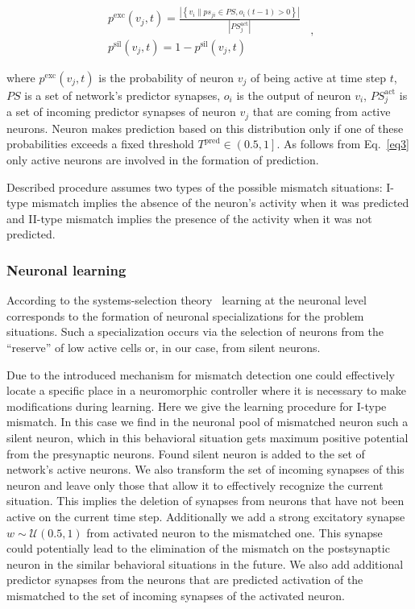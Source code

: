 \documentclass[letterpaper]{article}
\begin{document}
\begin{equation}
	\label{eq3}
	\begin{array}{c}
		p^{\mathrm{exc}}\left(v_{j}, t\right) = \frac{\left\vert\left\{v_{i} \| ps_{ji} \in PS, o_{i}\left(t-1\right)>0\right\}\right\vert}
			{\left\vert PS_{j}^{\mathrm{act}}\right\vert} \\
		p^{\mathrm{sil}}\left(v_{j}, t\right) = 1 - p^{\mathrm{sil}}\left(v_{j}, t\right)
	\end{array}
	\enspace , 
\end{equation}      

\noindent where $p^{\mathrm{exc}}\left(v_{j}, t\right)$ is the probability of neuron $v_{j}$ of being active at time step $t$, $PS$ is a set of network's predictor synapses, $o_{i}$ is the output of neuron $v_{i}$, $PS_{j}^{\mathrm{act}}$ is a set of incoming predictor synapses of neuron $v_{j}$ that are coming from active neurons. Neuron makes prediction based on this distribution only if one of these probabilities exceeds a fixed threshold $T^{\mathrm{pred}}\in\left(0.5,1\right]$. As follows from Eq.~\ref{eq3} only active neurons are involved in the formation of prediction. 

Described procedure assumes two types of the possible mismatch situations: I-type mismatch implies the absence of the neuron's activity when it was predicted and II-type mismatch implies the presence of the activity when it was not predicted. 

\subsubsection{Neuronal learning} According to the systems-selection theory~\citep{Shvyrkov1986} learning at the neuronal level corresponds to the formation of neuronal specializations for the problem situations. Such a specialization occurs via the selection of neurons from the ``reserve'' of low active cells or, in our case, from silent neurons.

Due to the introduced mechanism for mismatch detection one could effectively locate a specific place in a neuromorphic controller where it is necessary to make modifications during learning. Here we give the learning procedure for I-type mismatch. In this case we find in the neuronal pool of mismatched neuron such a silent neuron, which in this behavioral situation gets maximum positive potential from the presynaptic neurons. Found silent neuron is added to the set of network's active neurons. We also transform the set of incoming synapses of this neuron and leave only those that allow it to effectively recognize the current situation. This implies the deletion of synapses from neurons that have not been active on the current time step. Additionally we add a strong excitatory synapse $w\sim \mathcal{U}\left(0.5,1\right)$ from activated neuron to the mismatched one. This synapse could potentially lead to the elimination of the mismatch on the postsynaptic neuron in the similar behavioral situations in the future. We also add additional predictor synapses from the neurons that are predicted activation of the mismatched to the set of incoming synapses of the activated neuron. 
\end{document}
